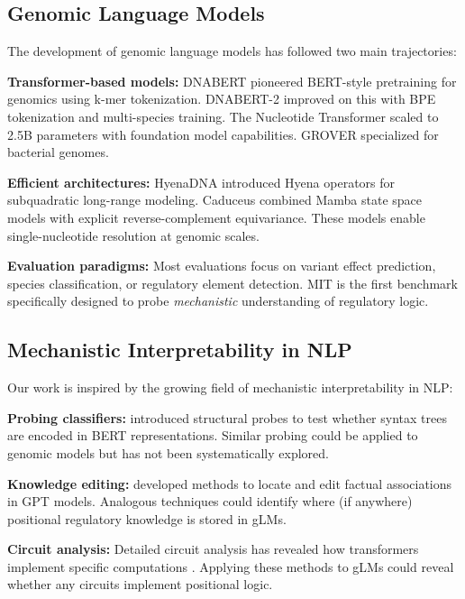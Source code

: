 \documentclass{article}
\begin{document}
\subsection{Genomic Language Models}

The development of genomic language models has followed two main trajectories:

\textbf{Transformer-based models:} DNABERT \citep{ji2021dnabert} pioneered BERT-style pretraining for genomics using k-mer tokenization. DNABERT-2 \citep{zhou2023dnabert2} improved on this with BPE tokenization and multi-species training. The Nucleotide Transformer \citep{dalla2023nucleotide} scaled to 2.5B parameters with foundation model capabilities. GROVER \citep{sanabria2024grover} specialized for bacterial genomes.

\textbf{Efficient architectures:} HyenaDNA \citep{nguyen2023hyenadna} introduced Hyena operators for subquadratic long-range modeling. Caduceus \citep{schiff2024caduceus} combined Mamba state space models with explicit reverse-complement equivariance. These models enable single-nucleotide resolution at genomic scales.

\textbf{Evaluation paradigms:} Most evaluations focus on variant effect prediction, species classification, or regulatory element detection. MIT is the first benchmark specifically designed to probe \textit{mechanistic} understanding of regulatory logic.

\subsection{Mechanistic Interpretability in NLP}

Our work is inspired by the growing field of mechanistic interpretability in NLP:

\textbf{Probing classifiers:} \citet{hewitt2019structural} introduced structural probes to test whether syntax trees are encoded in BERT representations. Similar probing could be applied to genomic models but has not been systematically explored.

\textbf{Knowledge editing:} \citet{meng2022locating} developed methods to locate and edit factual associations in GPT models. Analogous techniques could identify where (if anywhere) positional regulatory knowledge is stored in gLMs.

\textbf{Circuit analysis:} Detailed circuit analysis has revealed how transformers implement specific computations \citep{elhage2021mathematical,wang2023interpretability}. Applying these methods to gLMs could reveal whether any circuits implement positional logic.
\end{document}
